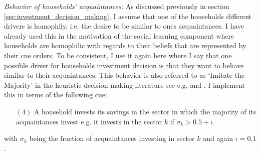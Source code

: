 \textit{Behavior of households' acquaintances:}
As discussed previously in section \ref{sec:investment_decision_making}, I assume that one of the households different drivers is homophily, i.e. the desire to be similar to ones acquaintances. I have already used this in the motivation of the social learning component where households are homophilic with regards to their beliefs that are represented by their cue orders. To be consistent, I use it again here where I say that one possible driver for households investment decision is that they want to behave similar to their acquaintances. This behavior is also referred to as `Imitate the Majority' in the heuristic decision making literature see e.g. \cite{Gigerenzer2009} \cite{garcia2009does} and \cite{Gigerenzer2011}. 
I implement this in terms of the following cue:
\begin{itemize}
  \item [$(4)$] A household invests its savings in the sector in which the majority of its acquaintances invest e.g. it invests in the sector $k$ if $\sigma_k > 0.5 + \iota$
\end{itemize}
with $\sigma_k$ being the fraction of acquaintances investing in sector $k$ and again $\iota=0.1$.

